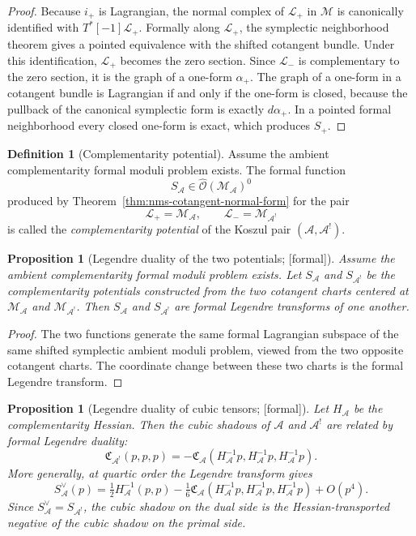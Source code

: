 \documentclass[11pt,oneside]{memoir}
\numberwithin{equation}{chapter}
\newtheorem{proposition}[theorem]{Proposition}
\theoremstyle{definition}
\newtheorem{definition}[theorem]{Definition}
\newcommand{\ClaimStatusProvedHere}{\textnormal{[formal]}}
\newcommand{\cA}{\mathcal A}
\begin{document}
\begin{proof}
Because $i_+$ is Lagrangian, the normal complex of $\mathcal L_+$ in $\mathcal M$ is canonically identified with $T^*[-1]\mathcal L_+$.  Formally along $\mathcal L_+$, the symplectic neighborhood theorem gives a pointed equivalence with the shifted cotangent bundle.  Under this identification, $\mathcal L_+$ becomes the zero section.  Since $\mathcal L_-$ is complementary to the zero section, it is the graph of a one-form $\alpha_+$.  The graph of a one-form in a cotangent bundle is Lagrangian if and only if the one-form is closed, because the pullback of the canonical symplectic form is exactly $d\alpha_+$.  In a pointed formal neighborhood every closed one-form is exact, which produces $S_+$.\qedhere
\end{proof}

\begin{definition}[Complementarity potential]
\label{def:nms-complementarity-potential}
Assume the ambient complementarity formal moduli problem exists.  The formal function
\[
S_{\cA}\in \widehat{\mathcal O}(\mathcal M_{\cA})^0
\]
produced by Theorem~\ref{thm:nms-cotangent-normal-form} for the pair
\[
\mathcal L_+=\mathcal M_{\cA},
\qquad
\mathcal L_- = \mathcal M_{\cA^!}
\]
is called the \emph{complementarity potential} of the Koszul pair $(\cA,\cA^!)$.
\end{definition}

\begin{proposition}[Legendre duality of the two potentials; \ClaimStatusProvedHere]
\label{prop:nms-legendre-duality}
Assume the ambient complementarity formal moduli problem exists.  Let $S_{\cA}$ and $S_{\cA^!}$ be the complementarity potentials constructed from the two cotangent charts centered at $\mathcal M_{\cA}$ and $\mathcal M_{\cA^!}$.  Then $S_{\cA}$ and $S_{\cA^!}$ are formal Legendre transforms of one another.
\end{proposition}

\begin{proof}
The two functions generate the same formal Lagrangian subspace of the same shifted symplectic ambient moduli problem, viewed from the two opposite cotangent charts.  The coordinate change between these two charts is the formal Legendre transform.\qedhere
\end{proof}

\begin{proposition}[Legendre duality of cubic tensors; \ClaimStatusProvedHere]
\label{prop:nms-legendre-cubic}
Let $H_{\cA}$ be the complementarity Hessian.  Then the cubic shadows of $\cA$ and $\cA^!$ are related by formal Legendre duality:
\[
\mathfrak C_{\cA^!}(p,p,p)
= -\mathfrak C_{\cA}(H_{\cA}^{-1}p, H_{\cA}^{-1}p, H_{\cA}^{-1}p).
\]
More generally, at quartic order the Legendre transform gives
\[
S_{\cA}^\vee(p)
= \tfrac12 H_{\cA}^{-1}(p,p)
- \tfrac{1}{6}\mathfrak C_{\cA}(H_{\cA}^{-1}p,H_{\cA}^{-1}p,H_{\cA}^{-1}p)
+ O(p^4).
\]
Since $S_{\cA}^\vee = S_{\cA^!}$, the cubic shadow on the dual side is the Hessian-transported negative of the cubic shadow on the primal side.
\end{proposition}
\end{document}
